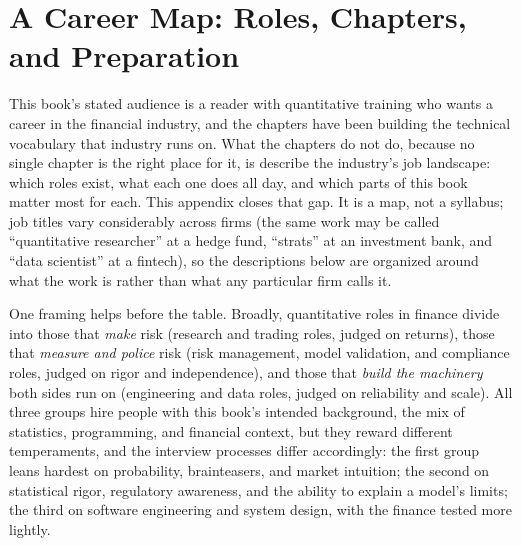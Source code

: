 \documentclass[../ai_in_finance]{subfiles}
\begin{document}
\ifSubfilesClassLoaded{\appendix}{}
\chapter{A Career Map: Roles, Chapters, and Preparation}
\label{app:careers}

This book's stated audience is a reader with quantitative training who wants a career in the financial industry, and the chapters have been building the technical vocabulary that industry runs on. What the chapters do not do, because no single chapter is the right place for it, is describe the industry's job landscape: which roles exist, what each one does all day, and which parts of this book matter most for each. This appendix closes that gap. It is a map, not a syllabus; job titles vary considerably across firms (the same work may be called ``quantitative researcher'' at a hedge fund, ``strats'' at an investment bank, and ``data scientist'' at a fintech), so the descriptions below are organized around what the work is rather than what any particular firm calls it.

One framing helps before the table. Broadly, quantitative roles in finance divide into those that \emph{make} risk (research and trading roles, judged on returns), those that \emph{measure and police} risk (risk management, model validation, and compliance roles, judged on rigor and independence), and those that \emph{build the machinery} both sides run on (engineering and data roles, judged on reliability and scale). All three groups hire people with this book's intended background, the mix of statistics, programming, and financial context, but they reward different temperaments, and the interview processes differ accordingly: the first group leans hardest on probability, brainteasers, and market intuition; the second on statistical rigor, regulatory awareness, and the ability to explain a model's limits; the third on software engineering and system design, with the finance tested more lightly.
\end{document}
